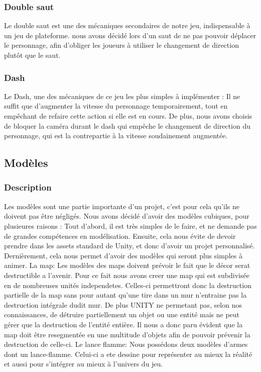 ﻿\documentclass{article}
\begin{document}
\subsubsection{Double saut}
Le double saut est une des mécaniques secondaires de notre jeu, indispensable
à un jeu de plateforme.
nous avons décidé lors d'un saut de ne pas pouvoir déplacer le personnage,
afin d'obliger les joueurs à utiliser le changement de direction
plutôt que le saut.

\subsubsection{Dash}
Le Dash, une des mécaniques de ce jeu les plus simples à implémenter :
Il ne suffit que d'augmenter la vitesse du personnage temporairement,
tout en empêchant de refaire cette action si elle est en cours.
De plus, nous avons choisis de bloquer la caméra durant le dash qui empêche le changement
de direction du personnage, qui est la contrepartie à la vitesse soudainement augmentée.


\subsection{Modèles}
\subsubsection{Description}
Les modèles sont une partie importante d'un projet, c'est pour cela qu'ils ne doivent pas être négligés.
Nous avons décidé d'avoir des modèles cubiques, pour plusieures raisons :
Tout d'abord, il est très simples de le faire, et ne demande pas de grandes compétences en modélisation.
Ensuite, cela nous évite de devoir prendre dans les assets standard de Unity, et donc d'avoir un projet personnalisé.
Dernièrement, cela nous permet d'avoir des modèles qui seront plus simples à animer.
\newline\newline La map:
\newline Les modèles des maps doivent prévoir le fait que le décor serat destructible a l'avenir. Pour ce fait nous avons creer une map qui est subdivisée en de nombreuses unités independetes.
Celles-ci permettront donc la destruction partielle de la map sans pour autant qu'une tire dans un mur n'entraine pas la destruction intégrale dudit mur.
De plus UNITY ne permetant pas, selon nos connaissances, de détruire partiellement un objet ou une entité mais ne peut gérer que la destruction de l'entité entière.
Il nous a donc paru évident que la map doit être resegmentée en une multitude d'objets afin de pouvoir prévenir la destruction de celle-ci.
\newline\newline Le lance flamme:
\newline Nous possédons deux modèles d'armes dont un lance-flamme.
Celui-ci a ete dessine pour représenter au mieux la réalité et aussi pour s'intégrer au mieux à l'univers du jeu.
\end{document}
